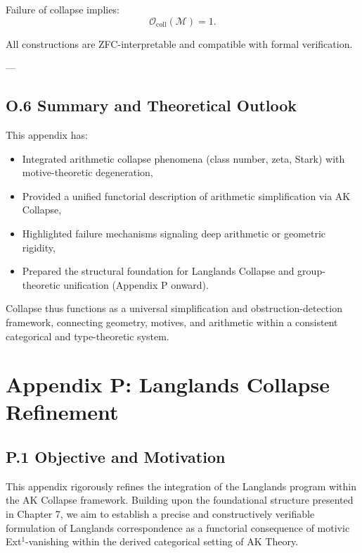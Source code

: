 \documentclass[11pt]{article}
\begin{document}
Failure of collapse implies:
\[
\mathcal{O}_{\mathrm{coll}}(\mathcal{M}) = 1.
\]

All constructions are ZFC-interpretable and compatible with formal verification.

---

\subsection*{O.6 Summary and Theoretical Outlook}

This appendix has:
\begin{itemize}
  \item Integrated arithmetic collapse phenomena (class number, zeta, Stark) with motive-theoretic degeneration,
  \item Provided a unified functorial description of arithmetic simplification via AK Collapse,
  \item Highlighted failure mechanisms signaling deep arithmetic or geometric rigidity,
  \item Prepared the structural foundation for Langlands Collapse and group-theoretic unification (Appendix P onward).
\end{itemize}

Collapse thus functions as a universal simplification and obstruction-detection framework, connecting geometry, motives, and arithmetic within a consistent categorical and type-theoretic system.




\section*{Appendix P: Langlands Collapse Refinement}

\subsection*{P.1 Objective and Motivation}

This appendix rigorously refines the integration of the Langlands program within the AK Collapse framework. Building upon the foundational structure presented in Chapter 7, we aim to establish a precise and constructively verifiable formulation of Langlands correspondence as a functorial consequence of motivic Ext$^1$-vanishing within the derived categorical setting of AK Theory.
\end{document}
